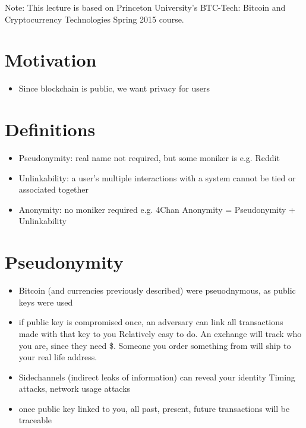 \documentclass{article}
\begin{document}
\maketitle

Note: This lecture is based on Princeton University's BTC-Tech: Bitcoin and Cryptocurrency Technologies Spring 2015 course.

\section{Motivation}
\begin{itemize}
\item Since blockchain is public, we want privacy for users
\end{itemize}



\section{Definitions}
\begin{itemize}
\item Pseudonymity: real name not required, but some moniker is e.g. Reddit
\item Unlinkability: a user's multiple interactions with a system cannot be tied or associated together
\item Anonymity: no moniker required e.g. 4Chan
\subitem Anonymity = Pseudonymity + Unlinkability
\end{itemize}

\section{Pseudonymity}
\begin{itemize}
\item Bitcoin (and currencies previously described) were pseuodnymous, as public keys were used
\item if public key is compromised once, an adversary can link all transactions made with that key to you
\subitem Relatively easy to do. An exchange will track who you are, since they need \$. Someone you order something from will ship to your real life address.
\item Sidechannels (indirect leaks of information) can reveal your identity
\subitem Timing attacks, network usage attacks
\item once public key linked to you, all past, present, future transactions will be traceable
\end{itemize}
\end{document}
